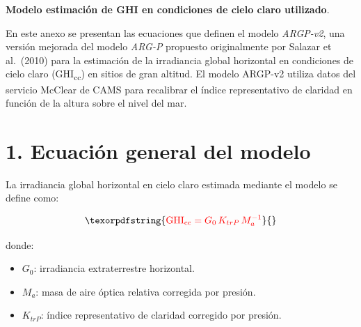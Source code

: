 \documentclass[letterpaper,12pt, twoside]{report}
\makeatletter
\let\newtitle\@title
\providecommand{\DIFdeltex}[1]{{\protect\color{red} \scriptsize #1}} %
\providecommand{\DIFaddbegin}{} %
\providecommand{\DIFaddend}{} %
\providecommand{\DIFdelbegin}{} %
\providecommand{\DIFdelend}{} %
\providecommand{\DIFdel}[1]{\texorpdfstring{\DIFdeltex{#1}}{}} %
\newcommand{\DIFscaledelfig}{0.5}
\newlength{\DIFdelgraphicswidth} %
\newlength{\DIFdelgraphicsheight} %
\newcommand{\DIFaddincludegraphics}[2][]{{\color{blue}\fbox{\DIFOincludegraphics[#1]{#2}}}} %
\newcommand{\DIFdelincludegraphics}[2][]{%
\sbox{\DIFdelgraphicsbox}{\DIFOincludegraphics[#1]{#2}}%
\settoboxwidth{\DIFdelgraphicswidth}{\DIFdelgraphicsbox} %
\settoboxtotalheight{\DIFdelgraphicsheight}{\DIFdelgraphicsbox} %
\scalebox{\DIFscaledelfig}{%
\parbox[b]{\DIFdelgraphicswidth}{\usebox{\DIFdelgraphicsbox}\\[-\baselineskip] \rule{\DIFdelgraphicswidth}{0em}}\llap{\resizebox{\DIFdelgraphicswidth}{\DIFdelgraphicsheight}{%
\setlength{\unitlength}{\DIFdelgraphicswidth}%
\begin{picture}(1,1)%
\thicklines\linethickness{2pt} %
{\color[rgb]{1,0,0}\put(0,0){\framebox(1,1){}}}%
{\color[rgb]{1,0,0}\put(0,0){\line( 1,1){1}}}%
{\color[rgb]{1,0,0}\put(0,1){\line(1,-1){1}}}%
\end{picture}%
}\hspace*{3pt}}} %
} %
\DeclareRobustCommand{\DIFaddbegin}{\DIFOaddbegin \let\includegraphics\DIFaddincludegraphics} %
\DeclareRobustCommand{\DIFaddend}{\DIFOaddend \let\includegraphics\DIFOincludegraphics} %
\DeclareRobustCommand{\DIFdelbegin}{\DIFOdelbegin \let\includegraphics\DIFdelincludegraphics} %
\DeclareRobustCommand{\DIFdelend}{\DIFOaddend \let\includegraphics\DIFOincludegraphics} %
\makeatother
\begin{document}
\DIFdelend \DIFaddbegin  \DIFaddend %
\DIFdelbegin %
\addcontentsline{toc}{chapter}{\DIFdel{\textbf{Anexo 1}}} 

\DIFdel{\textbf{Modelo estimación de GHI en condiciones de cielo claro utilizado}.
}%

\DIFdel{En este anexo se presentan las ecuaciones que definen el modelo \textit{ARGP-v2}, una versión 
mejorada del modelo \textit{ARG-P} propuesto originalmente por Salazar et al.~(2010) para la 
estimación de la irradiancia global horizontal en condiciones de cielo claro (GHI\textsubscript{cc}) 
en sitios de gran altitud.  
El modelo ARGP-v2 utiliza datos del servicio McClear de CAMS para recalibrar el índice 
representativo de claridad en función de la altura sobre el nivel del mar.
}%

\section*{\DIFdel{1. Ecuación general del modelo}}

\DIFdel{La irradiancia global horizontal en cielo claro estimada mediante el modelo se define como:
}%

\begin{displaymath}
\DIFdel{\mathrm{GHI_{cc}} = G_0 \, K_{trP} \, M_a^{-1}
\label{eq:argp_general}
}\end{displaymath}%

\DIFdel{donde:
}%
\begin{itemize}%
\item%
\DIFdel{$G_0$: irradiancia extraterrestre horizontal.
  }%
\item%
\DIFdel{$M_a$: masa de aire óptica relativa corregida por presión.
  }%
\item%
\DIFdel{$K_{trP}$: índice representativo de claridad corregido por presión.
}
\end{itemize}%
\end{document}
